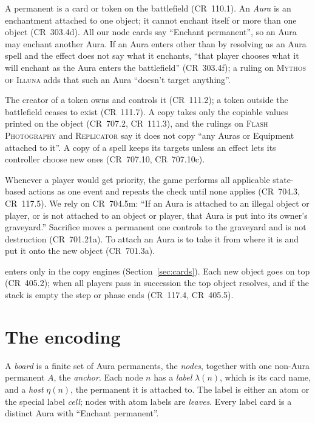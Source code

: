 \documentclass[11pt]{article}
\theoremstyle{definition}
\newcommand{\card}[1]{{\mdseries\scshape #1}}
\newcommand{\CR}[1]{CR~#1}
\begin{document}
\begin{description}[leftmargin=1em,nosep]
\item[Permanents and Auras.] A permanent is a card or token on the battlefield
  (\CR{110.1}). An \emph{Aura} is an enchantment attached to one object; it cannot enchant
  itself or more than one object (\CR{303.4d}). All our node cards say ``Enchant
  permanent'', so an Aura may enchant another Aura. If an Aura enters other than by
  resolving as an Aura spell and the effect does not say what it enchants, ``that player
  chooses what it will enchant as the Aura enters the battlefield'' (\CR{303.4f}); a ruling
  on \card{Mythos of Illuna} adds that such an Aura ``doesn't target anything''.
\item[Tokens and copies.] The creator of a token owns and controls it (\CR{111.2}); a token
  outside the battlefield ceases to exist (\CR{111.7}). A copy takes only the copiable
  values printed on the object (\CR{707.2}, \CR{111.3}), and the rulings on \card{Flash
  Photography} and \card{Replicator} say it does not copy ``any Auras or Equipment attached
  to it''. A copy of a spell keeps its targets unless an effect lets its controller choose
  new ones (\CR{707.10}, \CR{707.10c}).
\item[State-based actions, sacrifice, attach.] Whenever a player would get priority, the
  game performs all applicable state-based actions as one event and repeats the check
  until none applies (\CR{704.3}, \CR{117.5}). We rely on \CR{704.5m}: ``If an Aura is
  attached to an illegal object or player, or is not attached to an object or player, that
  Aura is put into its owner's graveyard.'' Sacrifice moves a permanent one controls to the
  graveyard and is not destruction (\CR{701.21a}). To attach an Aura is to take it from
  where it is and put it onto the new object (\CR{701.3a}).
\item[The stack] enters only in the copy engines (Section~\ref{sec:cards}). Each new object
  goes on top (\CR{405.2}); when all players pass in succession the top object resolves,
  and if the stack is empty the step or phase ends (\CR{117.4}, \CR{405.5}).
\end{description}


\section{The encoding}\label{sec:encoding}

A \emph{board} is a finite set of Aura permanents, the \emph{nodes}, together with one
non-Aura permanent $A$, the \emph{anchor}. Each node $n$ has a \emph{label} $\lambda(n)$,
which is its card name, and a \emph{host} $\eta(n)$, the permanent it is attached to. The
label is either an atom or the special label \emph{cell}; nodes with atom labels are
\emph{leaves}. Every label card is a distinct Aura with ``Enchant permanent''.
\end{document}
